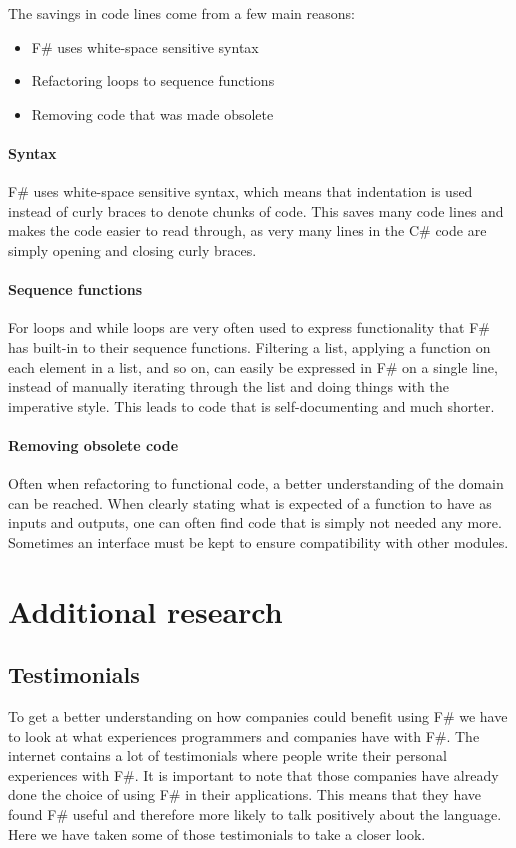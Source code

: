 \documentclass[12pt, a4paper]{article}
\begin{document}
The savings in code lines come from a few main reasons:
\begin{itemize}
	\item F\# uses white-space sensitive syntax
	\item Refactoring loops to sequence functions
	\item Removing code that was made obsolete
\end{itemize}

\paragraph{Syntax} F\# uses white-space sensitive syntax, which means that indentation is used instead of curly braces to denote chunks of code. This saves many code lines and makes the code easier to read through, as very many lines in the C\# code are simply opening and closing curly braces.

\paragraph{Sequence functions} For loops and while loops are very often used to express functionality that F\# has built-in to their sequence functions. Filtering a list, applying a function on each element in a list, and so on, can easily be expressed in F\# on a single line, instead of manually iterating through the list and doing things with the imperative style. This leads to code that is self-documenting and much shorter.

\paragraph{Removing obsolete code} Often when refactoring to functional code, a better understanding of the domain can be reached. When clearly stating what is expected of a function to have as inputs and outputs, one can often find code that is simply not needed any more. Sometimes an interface must be kept to ensure compatibility with other modules.

\newpage

\section{Additional research}

\subsection{Testimonials}
\label{Testimonials}
To get a better understanding on how companies could benefit using F\# we have to look at what experiences programmers and companies have with F\#. The internet contains a lot of testimonials where people write their personal experiences with F\#. It is important to note that those companies have already done the choice of using F\# in their applications. This means that they have found F\# useful and therefore more likely to talk positively about the language. Here we have taken some of those testimonials to take a closer look.
\end{document}
